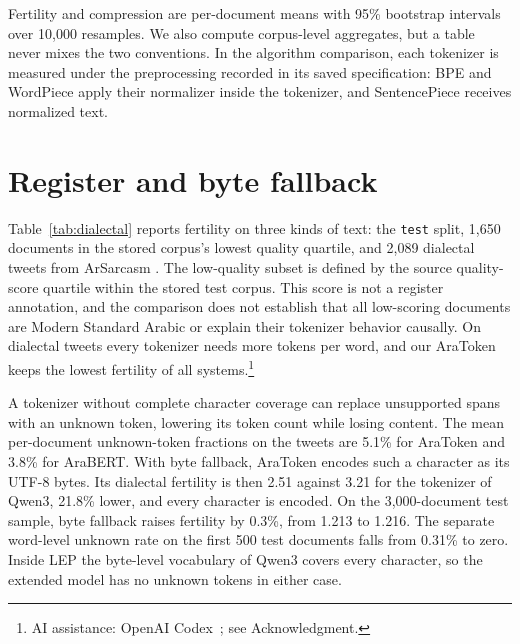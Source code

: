\documentclass{ieeeaccess}
\begin{document}
Fertility and compression are per-document means with 95\% bootstrap
intervals over 10{,}000 resamples. We also compute corpus-level aggregates,
but a table never mixes the two conventions. In the algorithm comparison,
each tokenizer is measured under the preprocessing recorded in its saved
specification: BPE and WordPiece apply their normalizer inside the tokenizer,
and SentencePiece receives normalized text.

\section{Register and byte fallback}
\label{app:dialect}

Table~\ref{tab:dialectal} reports fertility on three kinds of text: the
\texttt{test} split, 1{,}650 documents in the stored corpus's lowest quality quartile, and 2{,}089 dialectal
tweets from ArSarcasm \cite{abufarha2020arsarcasm}. The low-quality subset is defined by the source quality-score quartile within the stored test corpus. This score is not a register annotation, and the comparison does not establish that all low-scoring documents are Modern Standard Arabic or explain their tokenizer behavior causally. On dialectal tweets every tokenizer
needs more tokens per word, and our AraToken keeps the lowest fertility of all
systems.\footnote{AI assistance: OpenAI Codex~\cite{openaicodex2026}; see Acknowledgment.}

A tokenizer without complete character coverage can replace unsupported
spans with an unknown token, lowering its token count while losing content.
The mean per-document unknown-token fractions on the tweets are 5.1\% for
AraToken and 3.8\% for AraBERT. With byte fallback, AraToken encodes such a character as
its UTF-8 bytes. Its dialectal fertility is then 2.51 against 3.21 for the
tokenizer of Qwen3, 21.8\% lower, and every character is encoded. On the
3{,}000-document test sample, byte fallback raises fertility by 0.3\%, from
1.213 to 1.216. The separate word-level unknown rate on the first 500 test
documents falls from 0.31\% to zero. Inside LEP the
byte-level vocabulary of Qwen3 covers every character, so the extended model
has no unknown tokens in either case.
\end{document}
